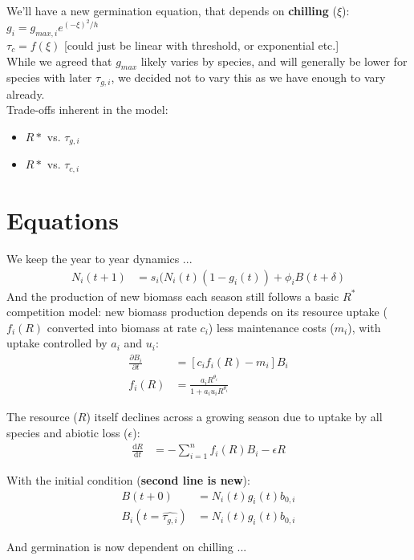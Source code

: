 \documentclass[11pt,letter]{article}
\begin{document}
We'll have a new germination equation, that depends on {\bf chilling} ($\xi$):
$g_i = g_{max, i}e^{(-\xi)^2/h}$\\
$\tau_c = f(\xi)$ [could just be linear with threshold, or exponential etc.]\\

While we agreed that $g_{max}$ likely varies by species, and will generally be lower for species with later $\tau_{g,i}$, we decided not to vary this as we have enough to vary already.\\

Trade-offs inherent in the model:
\begin{itemize}
\item $R*$ vs. $\tau_{g,i}$
\item $R*$ vs. $\tau_{c,i}$
\end{itemize}

\section{Equations} 
We keep the year to year dynamics ...
\begin{align}
N_{i}(t+1) & =
s_{i}(N_{i}(t)(1-g_{i}(t))+\phi_{i}B(t+\delta)
\end{align}
And the production of new biomass each season still follows a basic $R^*$ competition model: new biomass production depends on its resource uptake ($f_i(R)$ converted into biomass at rate $c_i$) less maintenance costs ($m_i$), with uptake controlled by $a_i$ and $u_i$:
\begin{align}
\frac{\partial B_{i}}{\partial t} &  = [c_{i}f_{i}(R) - m_{i}]B_{i} \\
f_{i}(R) & = \frac{a_{i}R^{\theta_{i}}}{1+a_{i}u_{i}R^{\theta_{i}}}
\end{align}

The resource ($R$) itself declines across a growing season due to uptake by all species and abiotic loss ($\epsilon$):
\begin{align}
\frac{\mathrm{d}R}{\mathrm{d}t} & = - \sum_{i=1}^{n}f_{i}(R)B_{i} -\epsilon R
\end{align}


With the initial condition ({\bf second line is new}):
\begin{align}
B(t+0) & = N_{i}(t)g_{i}(t)b_{0,i}\\
B_i(t=\hat{\tau_{g,i}}) & = N_{i}(t)g_{i}(t)b_{0,i}
\end{align}

And germination is now dependent on chilling ...
\end{document}
